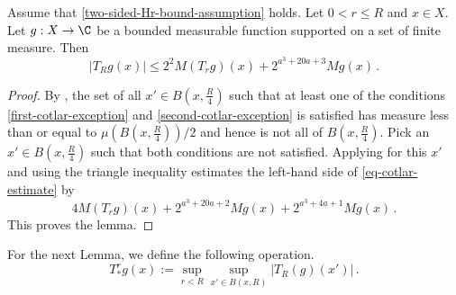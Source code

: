 \begin{lemma}
\label{Cotlar-estimate}
\leanok
{}
Assume that \eqref{two-sided-Hr-bound-assumption} holds.
Let $0<r\le R$ and  $x\in X$. Let $g:X\to\C$ be a bounded measurable function supported on a set of finite measure. Then
\begin{equation}\label{eq-cotlar-estimate}
|T_Rg(x)| \le 2^{2}M(T_rg)(x)+ 2^{a^3+20a+3} Mg(x)
\, .
\end{equation}
\end{lemma}


\begin{proof}
\leanok
By , the set of all $x'\in B(x,\frac {R} 4)$
such that at least one of the conditions
\eqref{first-cotlar-exception} and
\eqref{second-cotlar-exception} is satisfied has measure less than or equal to $\mu(B(x,\frac{R}{4}))/2$ and hence is not all of $B(x,\frac {R} 4)$.
Pick an $x'\in B(x,\frac {R} 4)$ such that both conditions are not satisfied.
Applying  for this $x'$ and using the triangle inequality
estimates the left-hand side of \eqref{eq-cotlar-estimate}
by
\begin{equation}
    4 M(T_rg)(x) + 2^{a^3 + 20a + 2} Mg(x) + 2^{a^3 + 4a + 1} Mg(x)\, .
\end{equation}
This proves the lemma.
\end{proof}

For the next Lemma, we define the following operation.
\begin{equation}\label{eq-simple--nontangential}
    T_{*}^r g(x):=\sup_{r<R}\sup_{x'\in B(x,R)} |T_R(g)(x')| \, .
\end{equation}

